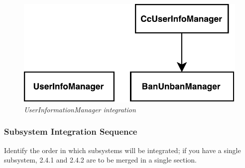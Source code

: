 \paragraph{}

		\begin{figure}[h]
			\centering
			\includegraphics[width=0.6\linewidth]{img/userIntegration}
			\caption{
				\label{fig:userIntegration} 
				\emph{UserInformationManager integration}
			}
		\end{figure}

\subsubsection{Subsystem Integration Sequence}
Identify the order in which subsystems will be integrated; if you have a single subsystem, 2.4.1 and 2.4.2 are to be merged in a single section.
